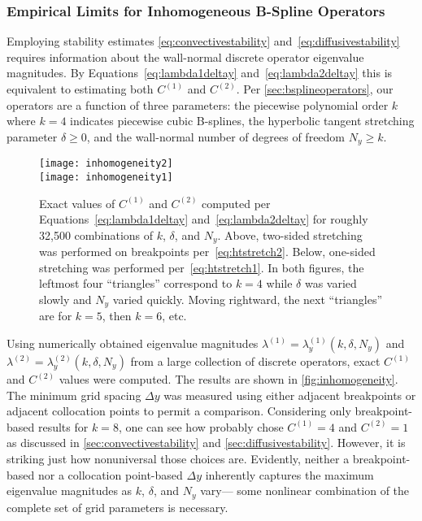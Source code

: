 \subsubsection{Empirical Limits for Inhomogeneous B-Spline Operators}
\label{sec:wallnormaleigval}

Employing stability estimates \eqref{eq:convectivestability}
and~\eqref{eq:diffusivestability} requires information about the wall-normal
discrete operator eigenvalue magnitudes.  By Equations~\eqref{eq:lambda1deltay}
and~\eqref{eq:lambda2deltay} this is equivalent to estimating both $C^{(1)}$
and $C^{(2)}$.  Per \autoref{sec:bsplineoperators}, our operators are a
function of three parameters: the piecewise polynomial order $k$ where $k=4$
indicates piecewise cubic B-splines, the hyperbolic tangent stretching
parameter $\delta\geq{}0$, and the wall-normal number of degrees of freedom
$N_y\geq{}k$.

\begin{figure}
  \centering
  \vspace{-1em}
  \texttt{[image: inhomogeneity2]}
  \\
  \vspace{0.5em}
  \texttt{[image: inhomogeneity1]}
  \\
  \caption[Exact maximum eigenvalues for inhomogeneous B-spline operators]{%
  Exact values of $C^{(1)}$ and $C^{(2)}$ computed per
  Equations~\eqref{eq:lambda1deltay} and~\eqref{eq:lambda2deltay} for roughly
  32,500 combinations of $k$, $\delta$, and $N_y$.  Above, two-sided stretching
  was performed on breakpoints per~\eqref{eq:htstretch2}.  Below, one-sided
  stretching was performed per~\eqref{eq:htstretch1}.  In both figures, the
  leftmost four ``triangles'' correspond to $k=4$ while $\delta$ was varied
  slowly and $N_y$ varied quickly.  Moving rightward, the next ``triangles''
  are for $k=5$, then $k=6$, etc.
  \label{fig:inhomogeneity}
  }
\end{figure}

Using numerically obtained eigenvalue magnitudes
$\lambda^{(1)}=\lambda^{(1)}_y\!\left(k,\delta,N_y\right)$ and
$\lambda^{(2)}=\lambda^{(2)}_y\!\left(k,\delta,N_y\right)$ from a large
collection of discrete operators, exact $C^{(1)}$ and $C^{(2)}$ values were
computed.  The results are shown in \autoref{fig:inhomogeneity}.  The minimum
grid spacing $\Delta{}y$ was measured using either adjacent breakpoints or
adjacent collocation points to permit a comparison.  Considering only
breakpoint-based results for $k=8$, one can see how \citet{Venugopal2003}
probably chose $C^{(1)}=4$ and $C^{(2)}=1$ as discussed in
\autoref{sec:convectivestability} and \autoref{sec:diffusivestability}.
However, it is striking just how nonuniversal those choices are.
Evidently, neither a breakpoint-based nor a collocation point-based $\Delta{}y$
inherently captures the maximum eigenvalue magnitudes as $k$, $\delta$, and
$N_y$ vary--- some nonlinear combination of the complete set of grid parameters
is necessary.

